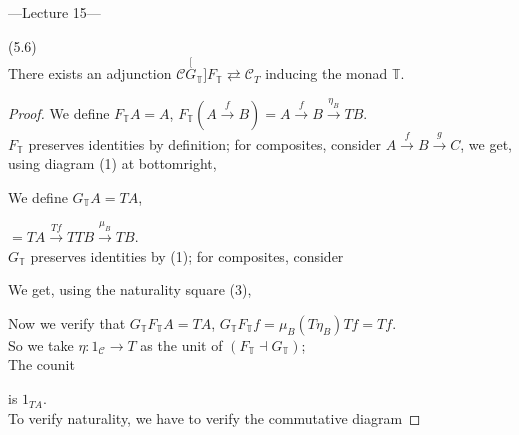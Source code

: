 \documentclass[a4paper]{article}
\begin{document}
---Lecture 15---

\begin{lemma} (5.6)\\
    There exists an adjunction $\mathcal{C} \stackrel[G_\mathbb{T}]{F_\mathbb{T}}{\rightleftarrows} \mathcal{C}_T$ inducing the monad $\mathbb{T}$.
    \begin{proof}
        We define $F_\mathbb{T} A = A$, $F_\mathbb{T}(A \xrightarrow{f}B) = A\xrightarrow{f} B \xrightarrow{\eta_B} TB$.\\
        $F_\mathbb{T}$ preserves identities by definition; for composites, consider $A \xrightarrow{f} B \xrightarrow{g} C$, we get, using diagram (1) at bottomright,


        We define $G_\mathbb{T} A = TA$,
        $=TA\xrightarrow{Tf} TTB \xrightarrow{\mu_B} TB$.\\
        $G_\mathbb{T}$ preserves identities by (1); for composites, consider
        We get, using the naturality square (3),


        Now we verify that $G_\mathbb{T} F_\mathbb{T} A = TA$, $G_\mathbb{T} F_\mathbb{T} f = \mu_B (T\eta_B) Tf = Tf$.\\
        So we take $\eta:1_{\mathcal{C}} \to T$ as the unit of $(F_\mathbb{T} \dashv G_\mathbb{T})$;\\
        The counit
        is $1_{TA}$.\\
        To verify naturality, we have to verify the commutative diagram
        

\end{proof}
\end{lemma}
\end{document}
